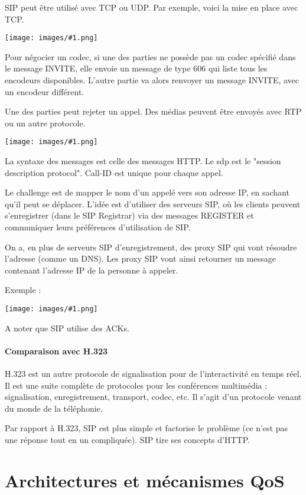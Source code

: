 \documentclass[10pt,a4paper]{report}
\newcommand{\dessin}[1]{\begin{center}\texttt{[image: images/\#1.png]}\end{center}}
\newcommand{\dessinS}[2]{\begin{center}\texttt{[image: images/\#1.png]}\end{center}}
\begin{document}
		SIP peut être utilisé avec TCP ou UDP. Par exemple, voici la mise en place avec TCP.	
		\dessin{89}
		
		Pour négocier un codec, si une des parties ne possède pas un codec spécifié dans le message INVITE, elle envoie un message de type 606 qui liste tous les encodeurs disponibles. L'autre partie va alors renvoyer un message INVITE, avec un encodeur différent.
		
		Une des parties peut rejeter un appel. Des médias peuvent être envoyés avec RTP ou un autre protocole.
		
		\dessinS{90}{.6}
		
		La syntaxe des messages est celle des messages HTTP. Le sdp est le "session description protocol". Call-ID est unique pour chaque appel.
		
		Le challenge est de mapper le nom d'un appelé vers son adresse IP, en sachant qu'il peut se déplacer. L'idée est d'utiliser des serveurs SIP, où les clients peuvent s'enregistrer (dans le SIP Registrar) via des messages REGISTER et communiquer leurs préférences d'utilisation de SIP.
		
		On a, en plus de serveurs SIP d'enregistrement, des proxy SIP qui vont résoudre l'adresse (comme un DNS). Les proxy SIP vont ainsi retourner un message contenant l'adresse IP de la personne à appeler.
		
		Exemple :
		
		\dessin{91}
		
		A noter que SIP utilise des ACKs.
		
			\subsubsection{Comparaison avec H.323}
			
			H.323 est un autre protocole de signalisation pour de l'interactivité en temps réel. Il est une suite complète de protocoles pour les conférences multimédia : signalisation, enregistrement, transport, codec, etc. Il s'agit d'un protocole venant du monde de la téléphonie.		
		
			Par rapport à H.323, SIP est plus simple et factorise le problème (ce n'est pas une réponse tout en un compliquée). SIP tire ses concepts d'HTTP.
					
\chapter{Architectures et mécanismes QoS}
	
\end{document}
